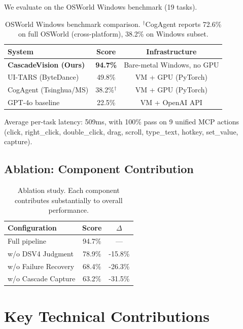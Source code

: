 \documentclass{article}
\begin{document}
We evaluate on the OSWorld Windows benchmark (19 tasks).

\begin{table}[h]
\centering
\begin{tabular}{lcc}
\toprule
\textbf{System} & \textbf{Score} & \textbf{Infrastructure} \\
\midrule
\textbf{CascadeVision (Ours)} & \textbf{94.7\%} & Bare-metal Windows, no GPU \\
UI-TARS (ByteDance) & 49.8\% & VM + GPU (PyTorch) \\
CogAgent (Tsinghua/MS) & 38.2\%$^\dagger$ & VM + GPU (PyTorch) \\
GPT-4o baseline & 22.5\% & VM + OpenAI API \\
\bottomrule
\end{tabular}
\caption{OSWorld Windows benchmark comparison. $^\dagger$CogAgent reports 72.6\% on full OSWorld (cross-platform), 38.2\% on Windows subset.}
\label{tab:results}
\end{table}

\noindent Average per-task latency: 509ms, with 100\% pass on 9 unified MCP actions (click, right\_click, double\_click, drag, scroll, type\_text, hotkey, set\_value, capture).

\subsection{Ablation: Component Contribution}

\begin{table}[h]
\centering
\begin{tabular}{lcc}
\toprule
\textbf{Configuration} & \textbf{Score} & \textbf{$\Delta$} \\
\midrule
Full pipeline & 94.7\% & --- \\
w/o DSV4 Judgment & 78.9\% & -15.8\% \\
w/o Failure Recovery & 68.4\% & -26.3\% \\
w/o Cascade Capture & 63.2\% & -31.5\% \\
\bottomrule
\end{tabular}
\caption{Ablation study. Each component contributes substantially to overall performance.}
\label{tab:ablation}
\end{table}

\section{Key Technical Contributions}
\end{document}
